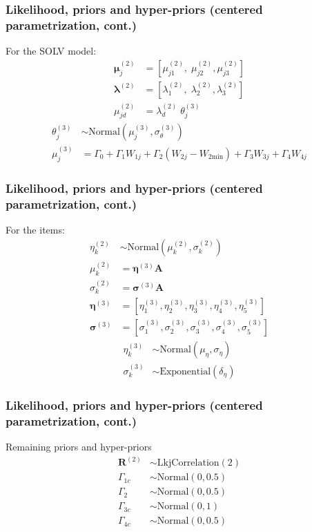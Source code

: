 \documentclass[arial,12pt,xcolor=dvipsnames]{beamer}
\begin{document}
%
\begin{frame}
	\frametitle{Likelihood, priors and hyper-priors
		(centered parametrization, cont.)}
	For the SOLV model:
	\begin{align}
		\boldsymbol{\mu}^{(2)}_{j} &= \left[ \mu^{(2)}_{j1}, \; \mu^{(2)}_{j2}, \mu^{(2)}_{j3} \right] \\
		\pmb{\lambda}^{(2)} &= \left[ \lambda^{(2)}_{1}, \; \lambda^{(2)}_{2}, \lambda^{(2)}_{3} \right] \\
		\mu^{(2)}_{jd} &= \lambda^{(2)}_{d} \; \theta^{(3)}_{j} 
	\end{align}
	\begin{align}
		\theta^{(3)}_{j} &\sim \text{Normal} \left( \mu^{(3)}_{j}, \sigma^{(3)}_{\theta} \right) \label{eq:theta} \\
		\mu^{(3)}_{j} &=  \Gamma_{0} + \Gamma_{1} W_{1j} + \Gamma_{2} (W_{2j} - W_{2\text{min}}) + \Gamma_{3} W_{3j} + \Gamma_{4} W_{4j} \label{eq:mu_SOLV}
	\end{align}
\end{frame}
%
\begin{frame}
	\frametitle{Likelihood, priors and hyper-priors
		(centered parametrization, cont.)}
	For the items:
	\begin{align}
		\eta^{(2)}_{k} &\sim \text{Normal} \left( \mu^{(2)}_{k}, \sigma^{(2)}_{k} \right) \label{eq:items} \\
		\mu^{(2)}_{k} &= \pmb{\eta}^{(3)} \mathbf{A} \label{eq:mu_items} \\
		\sigma^{(2)}_{k} &= \pmb{\sigma}^{(3)} \mathbf{A} \label{eq:sigma_items} \\
		\pmb{\eta}^{(3)} &= [ \eta^{(3)}_{1}, \eta^{(3)}_{2}, \eta^{(3)}_{3}, \eta^{(3)}_{4}, \eta^{(3)}_{5} ] \\
		\pmb{\sigma}^{(3)} &= [ \sigma^{(3)}_{1}, \sigma^{(3)}_{2}, \sigma^{(3)}_{3}, \sigma^{(3)}_{4}, \sigma^{(3)}_{5} ]
	\end{align}
	\begin{align}
		\eta^{(3)}_{k} &\sim \text{Normal} \left( \mu_{\eta}, \sigma_{\eta} \right) \\
		\sigma^{(3)}_{k} &\sim \text{Exponential} \left( \delta_{\eta} \right)
	\end{align}
\end{frame}
%
\begin{frame}
	\frametitle{Likelihood, priors and hyper-priors
		(centered parametrization, cont.)}
	Remaining priors and hyper-priors
	\begin{align}
		\boldsymbol{R}^{(2)} &\sim \text{LkjCorrelation}( 2 ) \\
		\Gamma_{1c} &\sim \text{Normal}( 0, 0.5 ) \\
		\Gamma_{2} &\sim \text{Normal}( 0, 0.5 ) \\
		\Gamma_{3c} &\sim \text{Normal}( 0, 1 ) \\
		\Gamma_{4c} &\sim \text{Normal}( 0, 0.5 ) 
	\end{align}
\end{frame}
\end{document}
